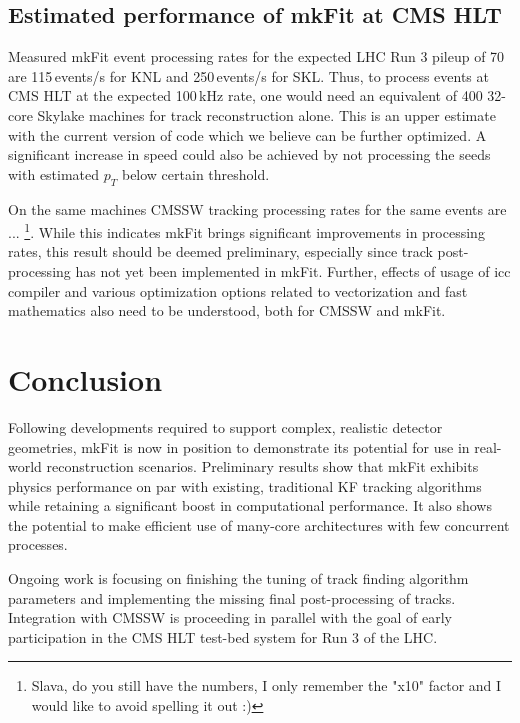 \documentclass{webofc}
\def\mkfit{mkFit\xspace}
\begin{document}
\subsection{Estimated performance of \mkfit at CMS HLT}

Measured \mkfit event processing rates for the expected LHC Run 3 pileup of 70
are 115\,events/s for KNL and 250\,events/s for SKL. Thus, to process events
at CMS HLT at the expected 100\,kHz rate, one would need an equivalent of 400
32-core Skylake machines for track reconstruction alone. This is an upper
estimate with the current version of code which we believe can be further
optimized. A significant increase in speed could also be achieved by not
processing the seeds with estimated $p_T$ below certain threshold.

On the same machines CMSSW tracking processing rates for the same events are ... \footnote{Slava, do
  you still have the numbers, I only remember the "x10" factor and I would
  like to avoid spelling it out :)}.  While this indicates \mkfit brings
significant improvements in processing rates, this result should be deemed
preliminary, especially since track post-processing has not yet been
implemented in \mkfit. Further, effects of usage of icc compiler and various
optimization options related to vectorization and fast mathematics also need
to be understood, both for CMSSW and \mkfit.


\section{Conclusion}

Following developments required to support complex, realistic detector
geometries, \mkfit is now in position to demonstrate its potential for use in
real-world reconstruction scenarios. Preliminary results show that \mkfit
exhibits physics performance on par with existing, traditional KF tracking
algorithms while retaining a significant boost in computational
performance. It also shows the potential to make efficient use of many-core
architectures with few concurrent processes.

Ongoing work is focusing on finishing the tuning of track finding algorithm
parameters and implementing the missing final post-processing of
tracks. Integration with CMSSW is proceeding in parallel with the goal of
early participation in the CMS HLT test-bed system for Run 3 of the LHC.
\end{document}
